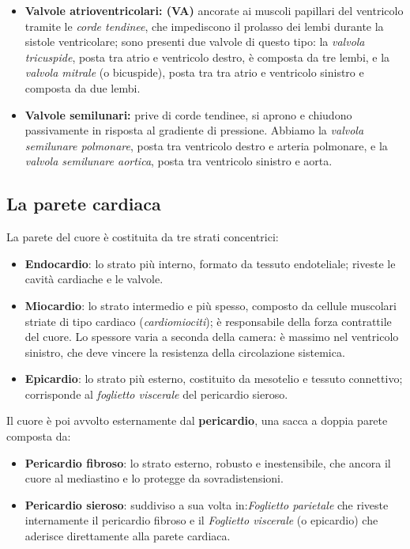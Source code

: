 \begin{itemize}
  \item \textbf{Valvole atrioventricolari: (VA)} ancorate ai muscoli papillari del ventricolo tramite le \textit{corde tendinee}, che impediscono il prolasso dei lembi durante la sistole ventricolare; sono presenti due valvole di questo tipo: la \textit{valvola tricuspide}, posta tra atrio e ventricolo destro, è composta da tre lembi, e la \textit{valvola mitrale} (o bicuspide), posta tra tra atrio e ventricolo sinistro e composta da due lembi. 
  \item \textbf{Valvole semilunari:} prive di corde tendinee, si aprono e chiudono passivamente in risposta al gradiente di pressione. Abbiamo la \textit{valvola semilunare polmonare}, posta tra ventricolo destro e arteria polmonare, e la \textit{valvola semilunare aortica}, posta tra ventricolo sinistro e aorta.
\end{itemize}

\subsection{La parete cardiaca}

La parete del cuore è costituita da tre strati concentrici:
\begin{itemize}
  \item \textbf{Endocardio}: lo strato più interno, formato da tessuto endoteliale; riveste le cavità cardiache e le valvole.
  \item \textbf{Miocardio}: lo strato intermedio e più spesso, composto da cellule muscolari striate di tipo cardiaco (\textit{cardiomiociti}); è responsabile della forza contrattile del cuore. Lo spessore varia a seconda della camera: è massimo nel ventricolo sinistro, che deve vincere la resistenza della circolazione sistemica.
  \item \textbf{Epicardio}: lo strato più esterno, costituito da mesotelio e tessuto connettivo; corrisponde al \textit{foglietto viscerale} del pericardio sieroso.
\end{itemize}

Il cuore è poi avvolto esternamente dal \textbf{pericardio}, una sacca a doppia parete composta da:

\begin{itemize}
  \item \textbf{Pericardio fibroso}: lo strato esterno, robusto e inestensibile, che ancora il cuore al mediastino e lo protegge da sovradistensioni.
  \item \textbf{Pericardio sieroso}: suddiviso a sua volta in:\textit{Foglietto parietale} che riveste internamente il pericardio fibroso e il \textit{Foglietto viscerale} (o epicardio) che aderisce direttamente alla parete cardiaca.
\end{itemize}

